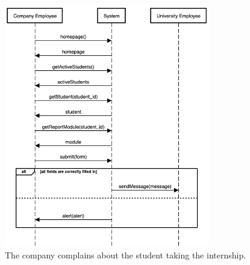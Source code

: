     \begin{figure}[H]
        \centering
        \includegraphics[width=0.8\textwidth]{RASD/Assets/SequenceDiagrams/10-company-sends-a-complaint.png}
        \caption{The company complains about the student taking the internship.}
        \label{fig:The company complains about the student taking the internship}
    \end{figure}

